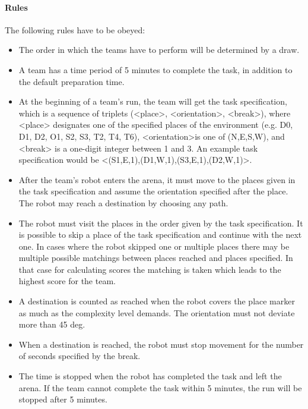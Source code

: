 \paragraph{Rules}
The following rules have to be obeyed:

\begin{itemize}
\item The order in which the teams have to perform will be determined by a draw.
\item A team has a time period of 5 minutes to complete the task, in addition to the default preparation time.
\item At the beginning of a team’s run, the team will get the task specification, which is a sequence of triplets (\textless place\textgreater, \textless orientation\textgreater, \textless break\textgreater), where <place> designates one of the specified places of the environment (e.g. D0, D1, D2, O1, S2, S3, T2, T4, T6), \textless orientation\textgreater is one of (N,E,S,W), and <break> is a one-digit integer between 1 and 3. An example task specification would be \textless (S1,E,1),(D1,W,1),(S3,E,1),(D2,W,1)\textgreater .
\item After the team’s robot enters the arena, it must move to the places given in the task specification and assume the orientation specified after the place. The robot may reach a destination by choosing any path.
\item The robot must visit the places in the order given by the task specification. It is possible to skip a place of the task specification and continue with the next one. In cases where the robot skipped one or multiple places there may be multiple possible matchings between places reached and places specified. In that case for calculating scores the matching is taken which leads to the highest score for the team.
\item A destination is counted as reached when the robot covers the place marker as much as the complexity level demands. The orientation must not deviate more than 45 deg.
\item When a destination is reached, the robot must stop movement for the number of seconds specified by the break.
\item The time is stopped when the robot has completed the task and left the arena. If the team cannot complete the task within 5 minutes, the run will be stopped after 5 minutes.
\end{itemize}
%
%
%
